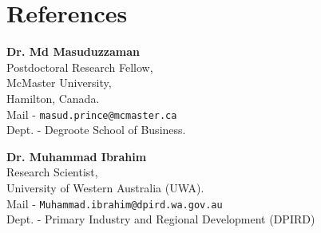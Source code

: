 \documentclass[letterpaper,11pt]{article}
\newcommand{\resumeSubHeadingListStart}{\begin{itemize}[leftmargin=0.15in, label={}]}
\newcommand{\resumeSubHeadingListEnd}{\end{itemize}}
\begin{document}
\section{References}
  \vspace{2pt}
\begin{center}
\begin{minipage}[t]{0.45\textwidth}
    \textbf{Dr. Md Masuduzzaman} \\
    Postdoctoral Research Fellow, \\
    McMaster University, \\
    Hamilton, Canada. \\
    Mail - \texttt{masud.prince@mcmaster.ca} \\
    Dept. - Degroote School of Business.
\end{minipage}
\hfill
\begin{minipage}[t]{0.45\textwidth}
    \textbf{Dr. Muhammad Ibrahim} \\
    Research Scientist, \\
    University of Western Australia (UWA). \\
    Mail - \texttt{Muhammad.ibrahim@dpird.wa.gov.au} \\
    Dept. - Primary Industry and Regional Development (DPIRD)
\end{minipage}
\end{center}
\end{document}
